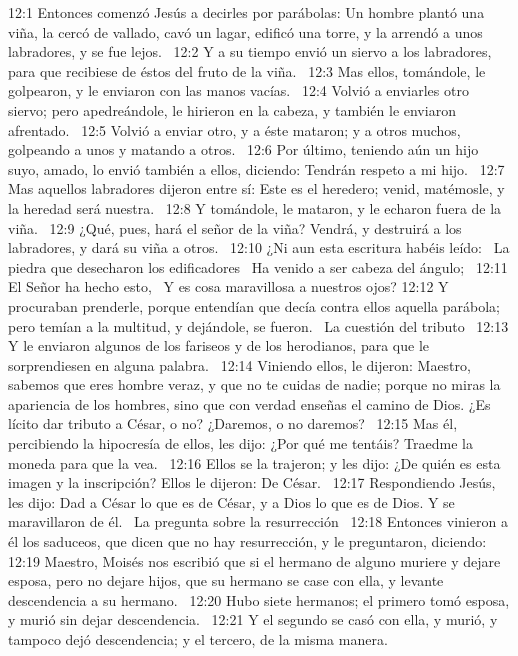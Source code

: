 12:1 Entonces comenzó Jesús a decirles por parábolas: Un hombre plantó una viña, la cercó de vallado, cavó un lagar, edificó una torre, y la arrendó a unos labradores, y se fue lejos.  
12:2 Y a su tiempo envió un siervo a los labradores, para que recibiese de éstos del fruto de la viña.  
12:3 Mas ellos, tomándole, le golpearon, y le enviaron con las manos vacías.  
12:4 Volvió a enviarles otro siervo; pero apedreándole, le hirieron en la cabeza, y también le enviaron afrentado.  
12:5 Volvió a enviar otro, y a éste mataron; y a otros muchos, golpeando a unos y matando a otros.  
12:6 Por último, teniendo aún un hijo suyo, amado, lo envió también a ellos, diciendo: Tendrán respeto a mi hijo.  
12:7 Mas aquellos labradores dijeron entre sí: Este es el heredero; venid, matémosle, y la heredad será nuestra.  
12:8 Y tomándole, le mataron, y le echaron fuera de la viña.  
12:9 ¿Qué, pues, hará el señor de la viña? Vendrá, y destruirá a los labradores, y dará su viña a otros.  
12:10 ¿Ni aun esta escritura habéis leído:  
La piedra que desecharon los edificadores  
Ha venido a ser cabeza del ángulo;  
12:11 El Señor ha hecho esto,  
Y es cosa maravillosa a nuestros ojos? 
12:12 Y procuraban prenderle, porque entendían que decía contra ellos aquella parábola; pero temían a la multitud, y dejándole, se fueron.  
La cuestión del tributo   
12:13 Y le enviaron algunos de los fariseos y de los herodianos, para que le sorprendiesen en alguna palabra.  
12:14 Viniendo ellos, le dijeron: Maestro, sabemos que eres hombre veraz, y que no te cuidas de nadie; porque no miras la apariencia de los hombres, sino que con verdad enseñas el camino de Dios. ¿Es lícito dar tributo a César, o no? ¿Daremos, o no daremos?  
12:15 Mas él, percibiendo la hipocresía de ellos, les dijo: ¿Por qué me tentáis? Traedme la moneda para que la vea.  
12:16 Ellos se la trajeron; y les dijo: ¿De quién es esta imagen y la inscripción? Ellos le dijeron: De César.  
12:17 Respondiendo Jesús, les dijo: Dad a César lo que es de César, y a Dios lo que es de Dios. Y se maravillaron de él.  
La pregunta sobre la resurrección   
12:18 Entonces vinieron a él los saduceos, que dicen que no hay resurrección, y le preguntaron, diciendo:  
12:19 Maestro, Moisés nos escribió que si el hermano de alguno muriere y dejare esposa, pero no dejare hijos, que su hermano se case con ella, y levante descendencia a su hermano.  
12:20 Hubo siete hermanos; el primero tomó esposa, y murió sin dejar descendencia.  
12:21 Y el segundo se casó con ella, y murió, y tampoco dejó descendencia; y el tercero, de la misma manera.  
